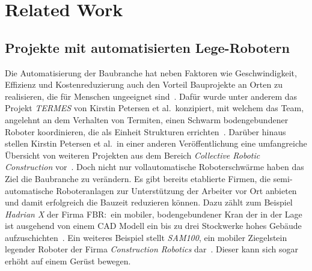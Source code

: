 \chapter{Related Work}\label{related}
\section{Projekte mit automatisierten Lege-Robotern}
Die Automatisierung der Baubranche hat neben Faktoren wie Geschwindigkeit, Effizienz und Kostenreduzierung auch den Vorteil Bauprojekte an Orten zu realisieren, die für Menschen ungeeignet sind~\cite{Petersen2012}.
Dafür wurde unter anderem das Projekt \textit{TERMES} von Kirstin Petersen et al.\ konzipiert, mit welchem das Team, angelehnt an dem Verhalten von Termiten, einen Schwarm bodengebundener Roboter koordinieren, die als Einheit Strukturen errichten~\cite{Petersen2012}.
Darüber hinaus stellen Kirstin Petersen et al.\ in einer anderen Veröffentlichung eine umfangreiche Übersicht von weiteren Projekten aus dem Bereich \textit{Collective Robotic Construction} vor~\cite{Petersen2019}.
Doch nicht nur vollautomatische Roboterschwärme haben das Ziel die Baubranche zu verändern.
Es gibt bereits etablierte Firmen, die semi-automatische Roboteranlagen zur Unterstützung der Arbeiter vor Ort anbieten und damit erfolgreich die Bauzeit reduzieren können.
Dazu zählt zum Beispiel \textit{Hadrian X} der Firma FBR:\ ein mobiler, bodengebundener Kran der in der Lage ist ausgehend von einem CAD Modell ein bis zu drei Stockwerke hohes Gebäude aufzuschichten~\cite{HadrianX}.
Ein weiteres Beispiel stellt \textit{SAM100}, ein mobiler Ziegelstein legender Roboter der Firma \textit{Construction Robotics} dar~\cite{SAM}.
Dieser kann sich sogar erhöht auf einem Gerüst bewegen.

